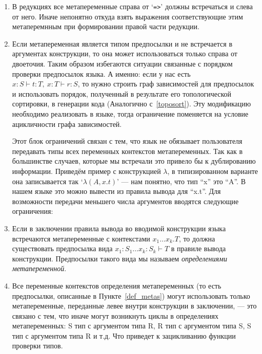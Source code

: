 \begin{enumerate}
\item В редукциях все метапеременные справа от `\lstinline{=>}' должны встречаться и слева от него. Иначе непонятно откуда взять выражения соответствующие этим метаперемнным при формировании правой части редукции.

\item \label{right::} Если метапеременная является типом предпосылки и не встречается в аргументах конструкции, то она может использоваться только справа от двоеточия. Таким образом избегаются ситуации связанные с порядком проверки предпосылок языка. А именно: если у нас есть $x : S \vdash t : T,\ x:T \vdash r : S$, то нужно строить граф зависимостей для предпосылок и использовать порядок, полученный в результате его топологической сортировки, в генерации кода (Аналогично с~\ref{toposort}). Эту модификацию необходимо реализовать в языке, тогда ограничение поменяется на условие ацикличности графа зависимостей.

\hfill

Этот блок ограничений связан с тем, что язык не обязывает пользователя передавать типы всех переменных контекстов метапеременных. Так как в большинстве случаев, которые мы встречали это привело бы к дублированию информации. Приведём пример с конструкцией $\lambda$, в типизированном варианте она записывается так `$\lambda(A, x.t)$' --- нам понятно, что тип ``x'' это ``A''. В нашем языке это можно вывести из правила вывода для ``x.t''. Для возможности передачи меньшего числа аргументов вводятся следующие ограничения:

\item \label{def_metas} Если в заключении правила вывода во вводимой конструкции языка встречаются метапеременные с контекстами $x_1 \ldots x_k . T$, то должна существовать предпосылка вида $x_1 : S_1 \ldots x_k : S_k  \vdash T$ в правиле вывода конструкции. Предпосылки такого вида мы называем \textit{определениями метапеременной}.

\item \label{order:Meta} Все переменные контекстов определения метапеременных (то есть предпосылки, описанные в Пункте~\ref{def_metas}) могут использовать только метапеременные, переданные левее внутри конструкции в заключении, --- это связано с тем, что иначе могут возникнуть циклы в определениях метапеременных: S тип с аргументом типа R, R тип с аргументом типа S, S тип с аргументом типа R и т.д. Что приведет к зацикливанию функции проверки типов.


\end{enumerate}

